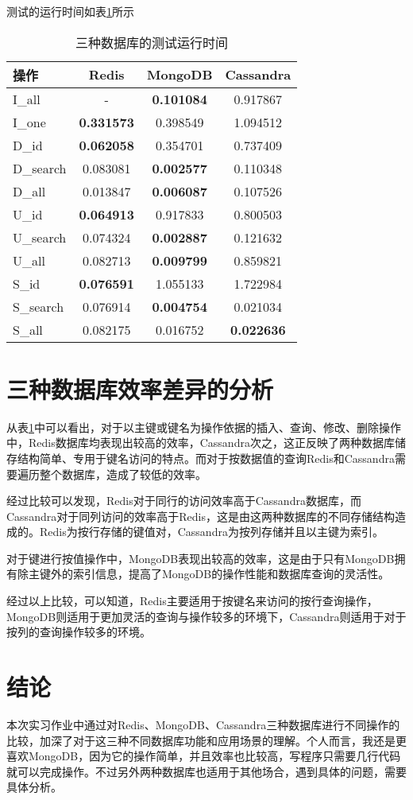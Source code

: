 \documentclass[12pt]{ctexart}
\begin{document}
测试的运行时间如表\ref{tab}所示

\begin{table}
    \centering
    \caption{三种数据库的测试运行时间\label{tab}}
    \begin{tabular}{l|c|c|c}
        \hline
        操作 & Redis & MongoDB & Cassandra\\
        \hline
        I\_all & - & \textbf{0.101084} & 0.917867\\
        I\_one & \textbf{0.331573} & 0.398549 & 1.094512\\
        D\_id & \textbf{0.062058} & 0.354701 & 0.737409\\
        D\_search & 0.083081 & \textbf{0.002577} & 0.110348\\
        D\_all & 0.013847 & \textbf{0.006087} & 0.107526\\
        U\_id & \textbf{0.064913} & 0.917833 & 0.800503\\
        U\_search & 0.074324 & \textbf{0.002887} & 0.121632\\
        U\_all & 0.082713 & \textbf{0.009799} & 0.859821\\
        S\_id & \textbf{0.076591} & 1.055133 & 1.722984\\
        S\_search & 0.076914 & \textbf{0.004754} & 0.021034\\
        S\_all & 0.082175 & 0.016752 & \textbf{0.022636}\\
        \hline
    \end{tabular}
\end{table}

\section{三种数据库效率差异的分析}

从表\ref{tab}中可以看出，对于以主键或键名为操作依据的插入、查询、修改、删除操作中，Redis数据库均表现出较高的效率，Cassandra次之，这正反映了两种数据库储存结构简单、专用于键名访问的特点。而对于按数据值的查询Redis和Cassandra需要遍历整个数据库，造成了较低的效率。

经过比较可以发现，Redis对于同行的访问效率高于Cassandra数据库，而Cassandra对于同列访问的效率高于Redis，这是由这两种数据库的不同存储结构造成的。Redis为按行存储的键值对，Cassandra为按列存储并且以主键为索引。

对于键进行按值操作中，MongoDB表现出较高的效率，这是由于只有MongoDB拥有除主键外的索引信息，提高了MongoDB的操作性能和数据库查询的灵活性。

经过以上比较，可以知道，Redis主要适用于按键名来访问的按行查询操作，MongoDB则适用于更加灵活的查询与操作较多的环境下，Cassandra则适用于对于按列的查询操作较多的环境。

\section{结论}

本次实习作业中通过对Redis、MongoDB、Cassandra三种数据库进行不同操作的比较，加深了对于这三种不同数据库功能和应用场景的理解。个人而言，我还是更喜欢MongoDB，因为它的操作简单，并且效率也比较高，写程序只需要几行代码就可以完成操作。不过另外两种数据库也适用于其他场合，遇到具体的问题，需要具体分析。
\end{document}
